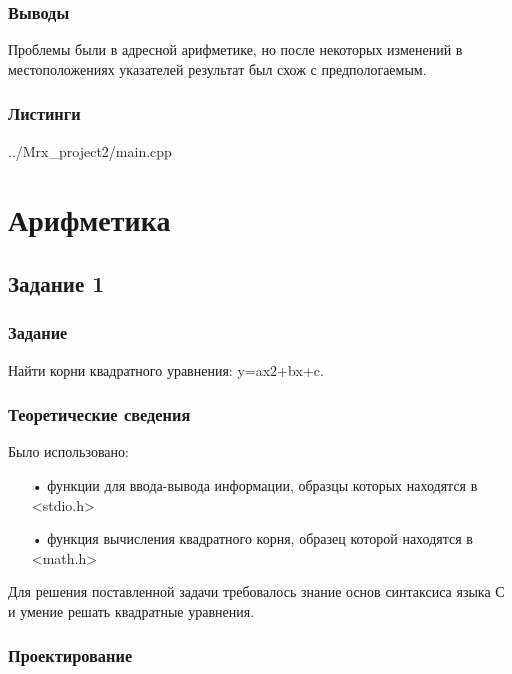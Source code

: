\documentclass[12pt,a4paper]{report}
\begin{document}
\subsection{Выводы}

Проблемы были в адресной арифметике, но после некоторых изменений в местоположениях указателей результат был схож с предпологаемым.

\subsection*{Листинги}


{../Mrx_project2/main.cpp}

\chapter{Арифметика}

\section{Задание 1}

\subsection{Задание}

Найти корни квадратного уравнения: y=ax2+bx+c.

\subsection{Теоретические сведения}

Было использовано:
\begin{enumerate}
\item[•] функции для ввода-вывода информации, образцы которых находятся в <stdio.h>
\item[•] функция вычисления квадратного корня, образец которой находятся в <math.h>
\end{enumerate}

Для решения поставленной задачи требовалось знание основ синтаксиса языка С и умение решать квадратные уравнения.



\subsection{Проектирование}
\end{document}
